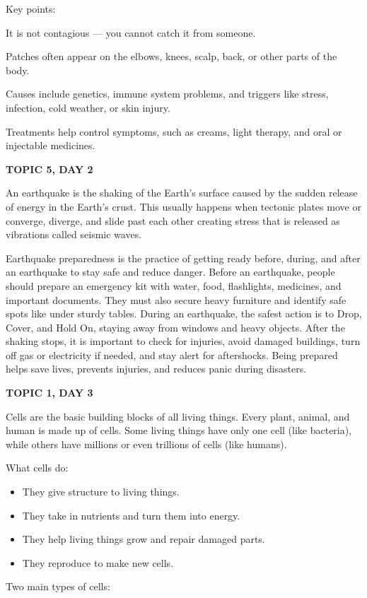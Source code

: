 {{{{{Key points:


It is not contagious — you cannot catch it from someone.


Patches often appear on the elbows, knees, scalp, back, or other parts of the body.


Causes include genetics, immune system problems, and triggers like stress, infection, cold weather, or skin injury.


Treatments help control symptoms, such as creams, light therapy, and oral or injectable medicines.

\textbf{TOPIC 5, DAY 2}

An earthquake is the shaking of the Earth's surface caused by the sudden release of energy in the Earth's crust. This usually happens when tectonic plates move or converge, diverge, and slide past each other creating stress that is released as vibrations called seismic waves.


Earthquake preparedness is the practice of getting ready before, during, and after an earthquake to stay safe and reduce danger. Before an earthquake, people should prepare an emergency kit with water, food, flashlights, medicines, and important documents. They must also secure heavy furniture and identify safe spots like under sturdy tables. During an earthquake, the safest action is to Drop, Cover, and Hold On, staying away from windows and heavy objects. After the shaking stops, it is important to check for injuries, avoid damaged buildings, turn off gas or electricity if needed, and stay alert for aftershocks. Being prepared helps save lives, prevents injuries, and reduces panic during disasters.

\textbf{TOPIC 1, DAY 3}


Cells are the basic building blocks of all living things.
Every plant, animal, and human is made up of cells. Some living things have only one cell (like bacteria), while others have millions or even trillions of cells (like humans).


What cells do:
\begin{itemize}
    \item They give structure to living things.
    \item They take in nutrients and turn them into energy.
    \item They help living things grow and repair damaged parts.
    \item They reproduce to make new cells.
\end{itemize}


Two main types of cells:


}}}}}
